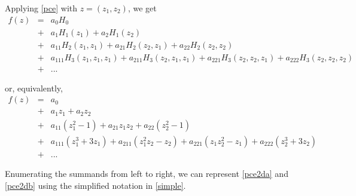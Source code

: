 \documentclass[11pt]{article}
\numberwithin{equation}{section}
\begin{document}
\begin{appendix}
Applying \eqref{pce} with  $z = (z_1, z_2)$, we get 
\begin{eqnarray}
f(z) & = & a_0 H_0 \nonumber \\
& + & a_1 H_1(z_1) + a_2 H_1(z_2) \nonumber \\
& + & a_{11} H_2(z_1, z_1) + a_{21} H_2(z_2, z_1) + a_{22} H_2(z_2, z_2) \nonumber \\
& + & a_{111} H_3(z_1, z_1, z_1) + a_{211} H_3(z_2, z_1, z_1) + a_{221} H_3(z_2, z_2, z_1) + a_{222} H_3(z_2, z_2, z_2) \nonumber \\
& + & ... \label{pce2da}
\end{eqnarray}

or, equivalently,
\begin{eqnarray}
f(z) & = & a_0 \nonumber \\
& + & a_1 z_1 + a_2 z_2 \nonumber \\
& + & a_{11} (z_1^2 - 1) + a_{21} z_1 z_2 + a_{22} (z_2^2 - 1) \nonumber \\
& + & a_{111} (z_1^3 + 3 z_1) + a_{211} (z_1^2 z_2 - z_2) + a_{221} (z_1 z_2^2 - z_1) + a_{222} (z_2^3 + 3 z_2) \nonumber \\
& + & ... \label{pce2db}
\end{eqnarray}

Enumerating the summands from left to right, we can represent \eqref{pce2da} and \eqref{pce2db} using the simplified notation in \eqref{simple}.





\end{appendix}
\end{document}
